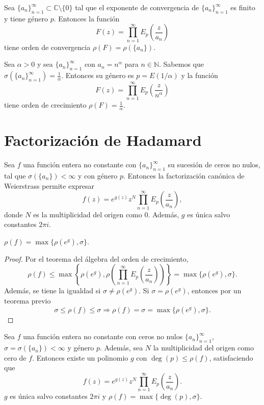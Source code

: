 \begin{theorem}
    Sea $\{a_n\}_{n=1}^\infty \subset \mathbb{C} \setminus \{0\}$ tal que el exponente de convergencia de $\{a_n\}_{n=1}^\infty$ es finito y tiene género $p$.
    Entonces la función
    $$F(z) = \prod_{n=1}^\infty E_p\left(\frac{z}{a_n}\right)$$
    tiene orden de convergencia $\rho(F) = \rho(\{a_n\})$.
\end{theorem}

\begin{example}
    Sea $\alpha > 0$ y sea $\{a_n\}_{n=1}^\infty$ con $a_n = n^\alpha$ para $n \in \mathbb{N}$.
    Sabemos que $\sigma(\{a_n\}_{n=1}^\infty) = \frac{1}{\alpha}$.
    Entonces su género es $p = E(1/\alpha)$ y la función
    $$F(z) = \prod_{n=1}^\infty E_p\left(\frac{z}{n^\alpha}\right)$$
    tiene orden de crecimiento $\rho(F) = \frac{1}{\alpha}$.
\end{example}

\section{Factorización de Hadamard}
Sea $f$ una función entera no constante con $\{a_n\}_{n=1}^\infty$ su sucesión de ceros no nulos, tal que $\sigma(\{a_n\}) < \infty$ y con género $p$.
Entonces la factorización canónica de Weierstrass permite expresar
$$f(z) = e^{g(z)}z^N \prod_{n=1}^\infty E_p\left(\frac{z}{a_n}\right),$$
donde $N$ es la multiplicidad del origen como 0.
Además, $g$ es única salvo constantes $2\pi i$.

\begin{proposition}
    $\rho(f) = \max\{\rho(e^g), \sigma\}$.
\end{proposition}

\begin{proof}
    Por el teorema del álgebra del orden de crecimiento,
    $$\rho(f) \leq \max\left\{\rho(e^g), \rho\left(\prod_{n=1}^\infty E_p\left(\frac{z}{a_n}\right)\right)\right\} = \max\{\rho(e^g), \sigma\}.$$
    Además, se tiene la igualdad si $\sigma \neq \rho(e^g)$.
    Si $\sigma = \rho(e^g)$, entonces por un teorema previo
    $$\sigma \leq \rho(f) \leq \sigma \Rightarrow \rho(f) = \sigma = \max\{\rho(e^g), \sigma\}.$$
\end{proof}

\begin{theorem}
    Sea $f$ una función entera no constante con ceros no nulos $\{a_n\}_{n=1}^\infty$, $\sigma = \sigma(\{a_n\}) < \infty$ y género $p$.
    Además, sea $N$ la multiplicidad del origen como cero de $f$.
    Entonces existe un polinomio $g$ con $\deg(p) \leq \rho(f)$, satisfaciendo que
    $$f(z) = e^{g(z)}z^N \prod_{n=1}^\infty E_p\left(\frac{z}{a_n}\right).$$
    $g$ es única salvo constantes $2\pi i$ y $\rho(f) = \max\{\deg(p), \sigma\}$.
\end{theorem}

